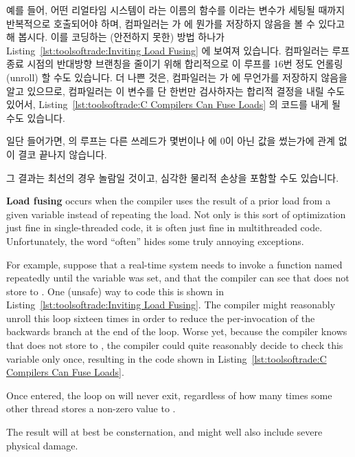 예를 들어, 어떤 리얼타임 시스템이  라는 이름의
함수를  이라는 변수가 세팅될 때까지 반복적으로 호출되어야
하며, 컴파일러는  가  에 뭔가를
저장하지 않음을 볼 수 있다고 해 봅시다.
이를 코딩하는 (안전하지 못한) 방법 하나가
Listing~\ref{lst:toolsoftrade:Inviting Load Fusing} 에 보여져 있습니다.
컴파일러는 루프 종료 시점의 반대방향 브랜칭을 줄이기 위해 합리적으로 이 루프를
16번 정도 언롤링 (unroll) 할 수도 있습니다.
더 나쁜 것은, 컴파일러는  가  에
무언가를 저장하지 않음을 알고 있으므로, 컴파일러는 이 변수를 단 한번만
검사하자는 합리적 결정을 내릴 수도 있어서,
Listing~\ref{lst:toolsoftrade:C Compilers Can Fuse Loads} 의 코드를 내게 될
수도 있습니다.
\begin{fcvref}
일단 들어가면,
 의 루프는 다른 쓰레드가 몇번이나 
에 0이 아닌 값을 썼는가에 관계 없이 결코 끝나지 않습니다.
\end{fcvref}
그 결과는 최선의 경우 놀람일 것이고, 심각한 물리적 손상을 포함할 수도 있습니다.

\iffalse

{\bf Load fusing} occurs when the compiler uses the result of a
prior load from a given variable instead of repeating the load.
Not only is this sort of optimization just fine in single-threaded
code, it is often just fine in multithreaded code.
Unfortunately, the word ``often'' hides some truly annoying exceptions.

For example, suppose that a real-time system needs to invoke a
function named  repeatedly until the
variable  was set, and that the compiler can see
that  does not store to .
One (unsafe) way to code this is shown in
Listing~\ref{lst:toolsoftrade:Inviting Load Fusing}.
The compiler might reasonably unroll this loop sixteen times in order
to reduce the per-invocation of the backwards branch at the end of the
loop.
Worse yet, because the compiler knows that 
does not store to , the compiler could quite reasonably
decide to check this variable only once, resulting in the code shown in
Listing~\ref{lst:toolsoftrade:C Compilers Can Fuse Loads}.
\begin{fcvref}
Once entered, the loop on
 will never exit, regardless of how
many times some other thread stores a non-zero value to .
\end{fcvref}
The result will at best be consternation, and might well also
include severe physical damage.

